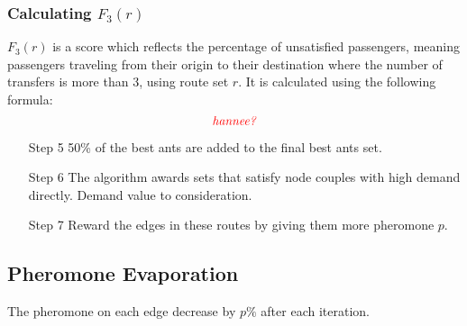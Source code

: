 

\subsubsection{Calculating $F_3(r)$}
$F_3(r)$ is a score which reflects the percentage of unsatisfied passengers, meaning passengers traveling from their origin to their destination where the number of transfers is more than 3, using route set $r$. It is calculated using the following formula:
$$\emph{\color{red}hannee?}$$

\begin{itemize}
\item[Step 5] 50\% of the best ants are added to the final best ants set.
\item[Step 6] The algorithm awards sets that satisfy node couples with high demand directly. Demand value to consideration.
\item[Step 7] Reward the edges in these routes by giving them more pheromone $p$.
\end{itemize}

\subsection{Pheromone Evaporation}

The pheromone on each edge decrease by $p\%$ after each iteration. 


